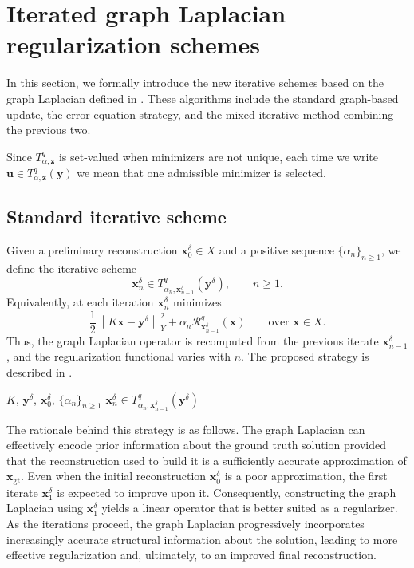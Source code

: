 \documentclass{article}
\theoremstyle{remark}
\newcommand{\gt}{\bm{x}_{\mathrm{gt}}}
\newcommand{\norm}[1]{\left\lVert #1 \right\rVert}
\newcommand{\Rreg}{\mathcal{R}}
\newcommand{\bx}{{\bm{x}}}
\newcommand{\by}{{\bm{y}}}
\newcommand{\bz}{{\bm{z}}}
\newcommand{\bu}{{\bm{u}}}
\begin{document}
\section{Iterated graph Laplacian regularization schemes}\label{sec:iterschemes}
In this section, we formally introduce the new iterative schemes based on the graph Laplacian defined in . These algorithms include the standard graph-based update, the error-equation strategy, and the mixed iterative method combining the previous two.

Since $T^q_{\alpha,\bz}$ is set-valued when minimizers are not unique, each time we write $\bu\in T^q_{\alpha,\bz}(\by)$ we mean that one admissible minimizer is selected.

\subsection{Standard iterative scheme}
Given a preliminary reconstruction $\bx_0^\delta \in X$ and a positive sequence $\{\alpha_n\}_{n\ge1}$, we define the iterative scheme
\begin{equation}\label{eq:standard-iter}
\bx_n^\delta \in T^q_{\alpha_n,\bx_{n-1}^\delta}(\by^\delta),
\qquad n \geq 1.
\end{equation}
Equivalently, at each iteration $\bx_n^\delta$ minimizes
\[
\frac12\norm{K\bx-\by^\delta}_Y^2+\alpha_n\Rreg_{\bx_{n-1}^\delta}^q(\bx)
\qquad\text{over }\bx\in X.
\]
Thus, the graph Laplacian operator is recomputed from the previous iterate $\bx_{n-1}^\delta$, and the regularization functional varies with $n$. The proposed strategy is described in .

\begin{algorithm}[h]
\caption{Standard iterative scheme}\label{alg:standard-iter}
\begin{algorithmic}[1]
\REQUIRE $K$, $\by^\delta$, $\bx_0^\delta$, $\{\alpha_n\}_{n\ge1}$
\STATE $\bx_n^\delta \in T^q_{\alpha_n,\bx_{n-1}^\delta}(\by^\delta)$
\ENDFOR
\end{algorithmic}
\end{algorithm}

The rationale behind this strategy is as follows. The graph Laplacian can effectively encode prior information about the ground truth solution provided that the reconstruction used to build it is a sufficiently accurate approximation of $\gt$. Even when the initial reconstruction $\bx_0^\delta$ is a poor approximation, the first iterate $\bx_1^\delta$ is expected to improve upon it. Consequently, constructing the graph Laplacian using $\bx_1^\delta$ yields a linear operator that is better suited as a regularizer. As the iterations proceed, the graph Laplacian progressively incorporates increasingly accurate structural information about the solution, leading to more effective regularization and, ultimately, to an improved final reconstruction.
\end{document}
